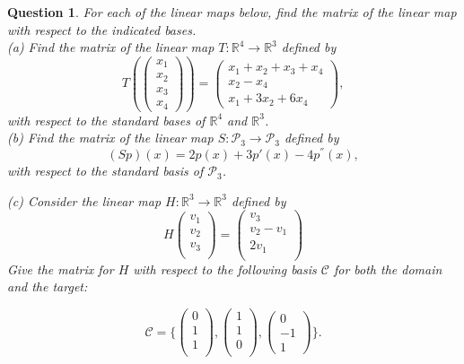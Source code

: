 \documentclass[12pt]{article}
\newtheorem{question}[thm]{Question}
\def\real{{\mathbb R}}
\def\P{\mathcal P}
\newcommand{\ColVecThree}[3]{\begin{pmatrix} #1\\ #2\\ #3\end{pmatrix}}
\newcommand{\ColVecFour}[4]{\begin{pmatrix} #1\\ #2\\#3 \\ #4\end{pmatrix}}
\begin{document}
\begin{question}
	\normalfont
	For each of the linear maps below, find the matrix of the linear map with respect to the indicated bases. \\
	
	
	\noindent (a) Find the matrix of the linear map $T: \real^4 \to \real^3$ defined by
	\[
	T(\ColVecFour{x_1}{x_2}{x_3}{x_4}) = \ColVecThree{x_1+x_2+x_3+x_4}{x_2-x_4}{x_1+3x_2+6x_4},
	\]
with respect to the standard bases of $\real^4$ and $\real^3$. \\

\vspace{.2cm}
\noindent (b) Find the matrix of the linear map $S: \P_3 \to \P_3$ defined by \[(Sp)(x) = 2p(x) + 3p'(x) - 4 p^{''}(x),\] with respect to the standard basis of $\P_3$. \\

\vspace{.2cm}
	
	\noindent	(c) Consider the linear map $H:\mathbb{R}^3 \rightarrow \mathbb{R}^3$ defined by $$H\left( \begin{array}{c}
v_1 \\
v_2 \\
v_3 \\
\end{array} \right)
= \left( \begin{array}{c}
 v_3\\
 v_2 - v_1\\
 2v_1 \\
 \end{array} \right)$$
\noindent Give the matrix for $H$ with respect to the following basis $\mathcal{C}$ for both the domain and the target: 

\[
\mathcal{C}= \Bigg\{\left( \begin{array}{c}
0 \\
1 \\
1\\
 \end{array}  \right), \left( \begin{array}{c}
1 \\
1 \\
0\\
 \end{array} \right), \left( \begin{array}{c}
0 \\
-1 \\
1\
 \end{array} \right)\Bigg\}.
 \]


\end{question}
\end{document}
